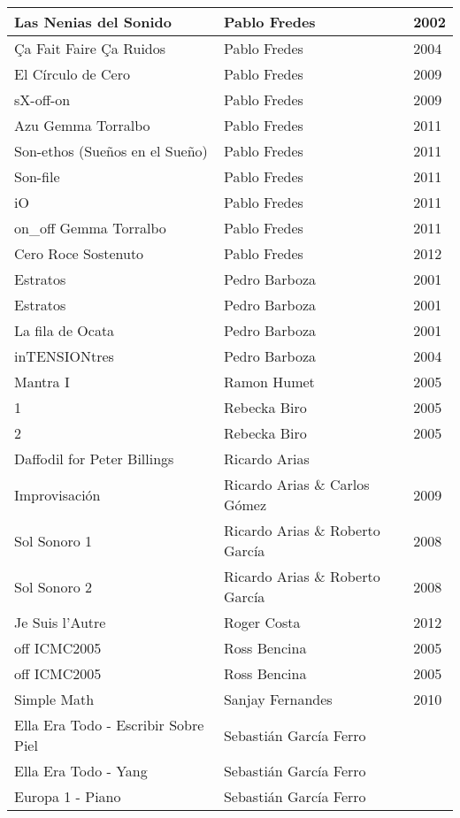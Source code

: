\begin{center}
\begin{longtable}{ p{}  p{}  p{} }
Las Nenias del Sonido & Pablo Fredes & 2002 \\ \midrule 
Ça Fait Faire Ça Ruidos & Pablo Fredes & 2004 \\ \midrule 
El Círculo de Cero & Pablo Fredes & 2009 \\ \midrule 
sX-off-on & Pablo Fredes & 2009 \\ \midrule 
Azu Gemma Torralbo & Pablo Fredes & 2011 \\ \midrule 
Son-ethos (Sueños en el Sueño) & Pablo Fredes & 2011 \\ \midrule 
Son-file & Pablo Fredes & 2011 \\ \midrule 
iO & Pablo Fredes & 2011 \\ \midrule 
on\_off Gemma Torralbo & Pablo Fredes & 2011 \\ \midrule 
Cero Roce Sostenuto & Pablo Fredes & 2012 \\ \midrule 
Estratos & Pedro Barboza & 2001 \\ \midrule 
Estratos & Pedro Barboza & 2001 \\ \midrule 
La fila de Ocata & Pedro Barboza & 2001 \\ \midrule 
inTENSIONtres & Pedro Barboza & 2004 \\ \midrule 
Mantra I & Ramon Humet & 2005 \\ \midrule 
1 & Rebecka Biro & 2005 \\ \midrule 
2 & Rebecka Biro & 2005 \\ \midrule 
Daffodil for Peter Billings & Ricardo Arias &  \\ \midrule 
Improvisación & Ricardo Arias \& Carlos Gómez & 2009 \\ \midrule 
Sol Sonoro 1 & Ricardo Arias \& Roberto García & 2008 \\ \midrule 
Sol Sonoro 2 & Ricardo Arias \& Roberto García & 2008 \\ \midrule 
Je Suis l'Autre & Roger Costa & 2012 \\ \midrule 
off ICMC2005 & Ross Bencina & 2005 \\ \midrule 
off ICMC2005 & Ross Bencina & 2005 \\ \midrule 
Simple Math & Sanjay Fernandes & 2010 \\ \midrule 
Ella Era Todo - Escribir Sobre Piel & Sebastián García Ferro &  \\ \midrule 
Ella Era Todo - Yang & Sebastián García Ferro &  \\ \midrule 
Europa 1 - Piano & Sebastián García Ferro &  \\ \midrule 

\end{longtable}
\end{center}
